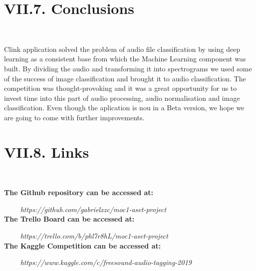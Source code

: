 \documentclass[11pt, a4papper]{report}
\theoremstyle{plain}
\theoremstyle{definition}
\theoremstyle{definition}
\theoremstyle{proposition}
\begin{document}
\section*{VII.7. Conclusions}
\

Clink application solved the problem of audio file classification by using deep learning as a consistent base from which the Machine Learning component was built. By dividing the audio and transforming it into spectrograms we used some of the success of image classification and brought it to audio classification. The competition was thought-provoking and it was a great opportunity for us to invest time into this part of audio processing, audio normalisation and image classification. Even though the aplication is nou in a Beta version, we hope we are going to come with further improvements.



\section*{VII.8. Links}
\

\textbf{\footnotemark The Github repository can be accessed at:}


\ \ \ \ \hspace{2cm} \textit{https://github.com/gabrielxzc/moc1-aset-project}
\\

\textbf{\footnotemark The Trello Board can be accessed at:}

\ \ \ \ \hspace{2cm} \textit{https://trello.com/b/phl7r8hL/moc1-aset-project}
\\

\textbf{The Kaggle Competition can be accessed at: }

\ \ \ \ \hspace{2cm} \textit{https://www.kaggle.com/c/freesound-audio-tagging-2019}
\end{document}
